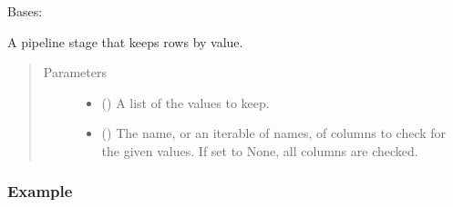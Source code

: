 \documentclass[letterpaper,10pt,english]{sphinxmanual}
\begin{document}

\begin{fulllineitems}
\label{\detokenize{dalio.pipe:dalio.pipe.select.ValKeep}}
Bases: 

A pipeline stage that keeps rows by value.
\begin{quote}\begin{description}
\item[{Parameters}] \leavevmode\begin{itemize}
\item {} 
 () \textendash{} A list of the values to keep.

\item {} 
 (\sphinxstyleliteralemphasis{\sphinxupquote{, }}) \textendash{} The name, or an iterable of names, of columns to check for the given
values. If set to None, all columns are checked.

\end{itemize}

\end{description}\end{quote}
\subsubsection*{Example}


\end{fulllineitems}
\end{document}
